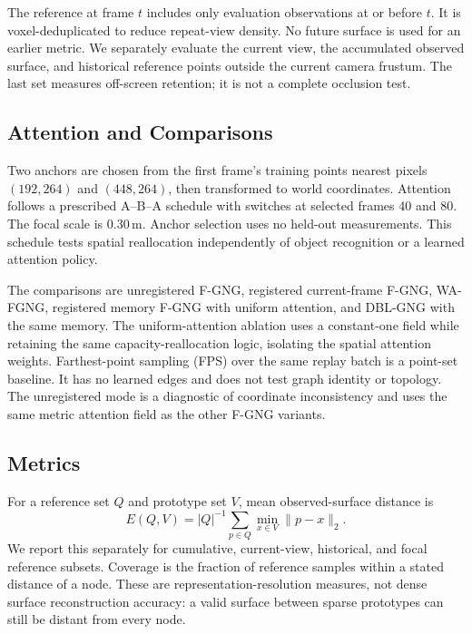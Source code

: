 \documentclass[letterpaper,10pt,conference]{template/ieeeconf}
\newcommand{\method}{WA-FGNG}
\begin{document}
The reference at frame $t$ includes only evaluation observations at or before $t$. It is voxel-deduplicated to reduce repeat-view density. No future surface is used for an earlier metric. We separately evaluate the current view, the accumulated observed surface, and historical reference points outside the current camera frustum. The last set measures off-screen retention; it is not a complete occlusion test.

\subsection{Attention and Comparisons}
Two anchors are chosen from the first frame's training points nearest pixels $(192,264)$ and $(448,264)$, then transformed to world coordinates. Attention follows a prescribed A--B--A schedule with switches at selected frames 40 and 80. The focal scale is 0.30\,m. Anchor selection uses no held-out measurements. This schedule tests spatial reallocation independently of object recognition or a learned attention policy.

The comparisons are unregistered F-GNG, registered current-frame F-GNG, \method{}, registered memory F-GNG with uniform attention, and DBL-GNG with the same memory. The uniform-attention ablation uses a constant-one field while retaining the same capacity-reallocation logic, isolating the spatial attention weights. Farthest-point sampling (FPS) over the same replay batch is a point-set baseline. It has no learned edges and does not test graph identity or topology. The unregistered mode is a diagnostic of coordinate inconsistency and uses the same metric attention field as the other F-GNG variants.



\subsection{Metrics}
For a reference set $Q$ and prototype set $V$, mean observed-surface distance is
\begin{equation}
 E(Q,V)=|Q|^{-1}\sum_{p\in Q}\min_{x\in V}\|p-x\|_2.
\end{equation}
We report this separately for cumulative, current-view, historical, and focal reference subsets. Coverage is the fraction of reference samples within a stated distance of a node. These are representation-resolution measures, not dense surface reconstruction accuracy: a valid surface between sparse prototypes can still be distant from every node.
\end{document}
